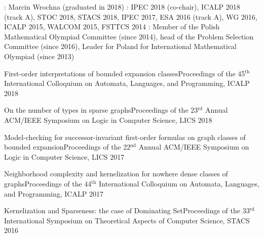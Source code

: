 \begin{small}
: Marcin Wrochna (graduated in 2018)
\vskip 0.1cm
: IPEC 2018 (co-chair), ICALP 2018 (track A), STOC 2018, STACS 2018, IPEC 2017, ESA 2016 (track A), WG 2016, ICALP 2015, WALCOM 2015, FSTTCS 2014
\vskip 0.1cm
: Member of the Polish Mathematical Olympiad Committee (since 2014), head of the Problem Selection Committee (since 2016), Leader for Poland for International Mathematical Olympiad (since 2013)
\end{small}


\setcounter{pcount}{1}

\begin{footnotesize}
{First-order interpretations of bounded expansion classes}{Proceedings of the 45$^{\text{th}}$ International Colloquium on Automata, Languages, and Programming, ICALP 2018}

{On the number of types in sparse graphs}{Proceedings of the 23$^{\textrm{rd}}$ Annual ACM/IEEE Symposium on Logic in Computer Science, LICS 2018}

{Model-checking for successor-invariant first-order formulas on graph classes of bounded expansion}{Proceedings of the 22$^{\textrm{nd}}$ Annual ACM/IEEE Symposium on Logic in Computer Science, LICS 2017}

{Neighborhood complexity and kernelization for nowhere dense classes of graphs}{Proceedings of the 44$^{\text{th}}$ International Colloquium on Automata, Languages, and Programming, ICALP 2017}

{Kernelization and Sparseness: the case of Dominating Set}{Proceedings of the 33$^{\textrm{rd}}$ International Symposium on Theoretical Aspects of Computer Science, STACS 2016}
\end{footnotesize}

